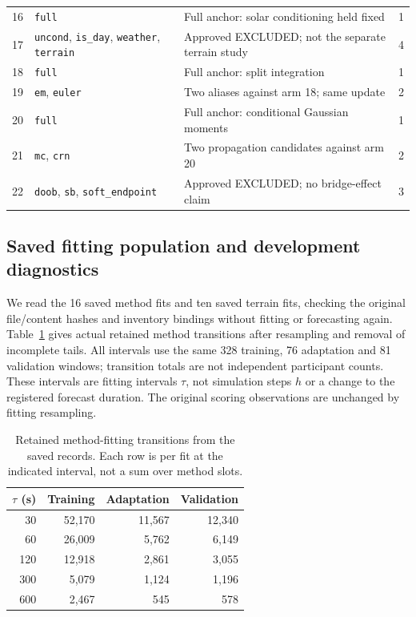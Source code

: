 \documentclass[11pt]{article}
\begin{document}
{\begin{longtable}{p{.06\linewidth}p{.36\linewidth}p{.43\linewidth}r}
16 & \texttt{full} & Full anchor: solar conditioning held fixed & 1\\
17 & \texttt{uncond}, \texttt{is\_day}, \texttt{weather}, \texttt{terrain} & Approved EXCLUDED; not the separate terrain study & 4\\
18 & \texttt{full} & Full anchor: split integration & 1\\
19 & \texttt{em}, \texttt{euler} & Two aliases against arm 18; same update & 2\\
20 & \texttt{full} & Full anchor: conditional Gaussian moments & 1\\
21 & \texttt{mc}, \texttt{crn} & Two propagation candidates against arm 20 & 2\\
22 & \texttt{doob}, \texttt{sb}, \texttt{soft\_endpoint} & Approved EXCLUDED; no bridge-effect claim & 3\\
\end{longtable}
}

\subsection{Saved fitting population and development diagnostics}
\label{sec:saved-fit-diagnostics}
We read the 16 saved method fits and ten saved terrain fits, checking the
original file/content hashes and inventory bindings without fitting or
forecasting again. Table~\ref{tab:fit-transition-counts} gives actual retained
method transitions after resampling and removal of incomplete tails.
All intervals use the same 328 training, 76 adaptation and 81 validation
windows; transition totals are not independent participant counts. These
intervals are fitting intervals \(\tau\), not simulation steps \(h\) or a
change to the registered forecast duration. The original scoring observations
are unchanged by fitting resampling.

\begin{table}[htbp]
\centering\small
\caption{Retained method-fitting transitions from the saved records.
Each row is per fit at the indicated interval, not a sum over method slots.}
\label{tab:fit-transition-counts}
\begin{tabular}{rrrr}
\toprule
\(\tau\) (s) & Training & Adaptation & Validation\\
\midrule
30 & 52,170 & 11,567 & 12,340\\
60 & 26,009 & 5,762 & 6,149\\
120 & 12,918 & 2,861 & 3,055\\
300 & 5,079 & 1,124 & 1,196\\
600 & 2,467 & 545 & 578\\
\bottomrule
\end{tabular}
\end{table}
\end{document}
